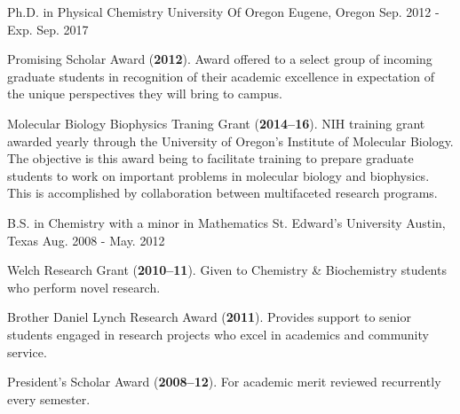 
%
%

\begin{cventries}
\cventry
  {Ph.D. in Physical Chemistry} %
    {University Of Oregon} %
    {Eugene, Oregon} %
    {Sep. 2012 - Exp. Sep. 2017} %
    {
      \begin{cvitems}
        \item{Promising Scholar Award (\textbf{2012}). Award offered to a select group of incoming graduate students in recognition of their academic excellence in expectation of the unique perspectives they will bring to campus.}
        \item{Molecular Biology Biophysics Traning Grant (\textbf{2014--16}). NIH training grant awarded yearly through the University of Oregon’s Institute of Molecular Biology. The objective is this award being to facilitate training to prepare graduate students to work on important problems in molecular biology and biophysics. This is accomplished by collaboration between multifaceted research programs.}
      \end{cvitems}
    }
  \cventry
     {B.S. in Chemistry with a minor in Mathematics} %
     {St. Edward's University} %
     {Austin, Texas} %
     {Aug. 2008 - May. 2012} %
     {
       \begin{cvitems} %
         \item{Welch Research Grant (\textbf{2010--11}). Given to Chemistry \& Biochemistry students who perform novel research.}
         \item{Brother Daniel Lynch Research Award (\textbf{2011}). Provides support to senior students engaged in research projects who excel in academics and community service.}
         \item{President's Scholar Award (\textbf{2008--12}). For academic merit reviewed recurrently every semester.}
       \end{cvitems}
     }
\end{cventries}
